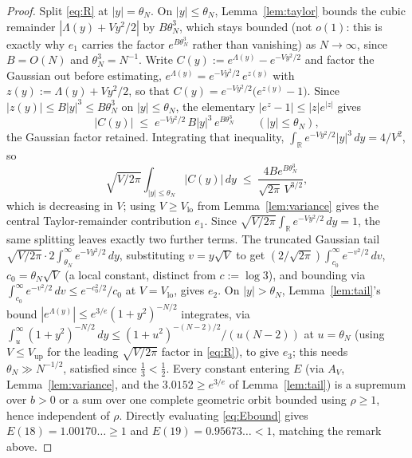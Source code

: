 \documentclass[11pt]{amsart}
\theoremstyle{plain}
\theoremstyle{definition}
\theoremstyle{remark}
\newcommand{\R}{\mathbb{R}}
\begin{document}
\begin{proof}
Split \eqref{eq:R} at $|y|=\theta_N$. On $|y|\le\theta_N$, Lemma~\ref{lem:taylor} bounds the cubic
remainder $|\Lambda(y)+Vy^2/2|$ by $B\theta_N^3$, which stays bounded (not $o(1)$: this is exactly
why $e_1$ carries the factor $e^{B\theta_N^3}$ rather than vanishing) as $N\to\infty$, since $B=O(N)$
and $\theta_N^3=N^{-1}$. Write $C(y):=e^{\Lambda(y)}-e^{-Vy^2/2}$ and factor the Gaussian out
before estimating, $e^{\Lambda(y)} = e^{-Vy^2/2}\,e^{z(y)}$ with $z(y) := \Lambda(y)+Vy^2/2$, so
that $C(y) = e^{-Vy^2/2}\bigl(e^{z(y)}-1\bigr)$. Since $|z(y)|\le B|y|^3 \le B\theta_N^3$ on
$|y|\le\theta_N$, the elementary $|e^z-1|\le|z|e^{|z|}$ gives
\[
|C(y)| \;\le\; e^{-Vy^2/2}\,B|y|^3\,e^{B\theta_N^3} \qquad (|y|\le\theta_N),
\]
the Gaussian factor retained. Integrating that inequality, $\int_\R e^{-Vy^2/2}|y|^3\,dy=4/V^2$, so
\[
\sqrt{V/2\pi}\int_{|y|\le\theta_N}|C(y)|\,dy \;\le\; \frac{4Be^{B\theta_N^3}}{\sqrt{2\pi}\,V^{3/2}},
\]
which is decreasing in $V$; using $V\ge V_{\mathrm{lo}}$ from Lemma~\ref{lem:variance} gives the
central Taylor-remainder contribution $e_1$. Since $\sqrt{V/2\pi}\int_\R e^{-Vy^2/2}\,dy = 1$, the
same splitting leaves exactly two further terms. The truncated Gaussian tail
$\sqrt{V/2\pi}\cdot2\int_{\theta_N}^\infty e^{-Vy^2/2}\,dy$, substituting $v=y\sqrt V$ to get
$(2/\sqrt{2\pi})\int_{c_0}^\infty e^{-v^2/2}\,dv$, $c_0=\theta_N\sqrt V$ (a local constant, distinct
from $c:=\log3$), and bounding via $\int_{c_0}^\infty e^{-v^2/2}\,dv\le e^{-c_0^2/2}/c_0$ at
$V=V_{\mathrm{lo}}$, gives $e_2$. On
$|y|>\theta_N$, Lemma~\ref{lem:tail}'s bound
$|e^{\Lambda(y)}|\le e^{3/e}(1+y^2)^{-N/2}$ integrates, via $\int_u^\infty(1+y^2)^{-N/2}\,dy \le
(1+u^2)^{-(N-2)/2}/(u(N-2))$ at $u=\theta_N$ (using $V\le V_{\mathrm{up}}$ for the leading
$\sqrt{V/2\pi}$ factor in \eqref{eq:R}), to give $e_3$; this needs $\theta_N \gg N^{-1/2}$, satisfied
since $\tfrac13<\tfrac12$. Every constant entering $E$ (via $A_V$, Lemma~\ref{lem:variance}, and the
$3.0152\ge e^{3/e}$ of Lemma~\ref{lem:tail}) is a supremum over $b>0$ or a sum over one complete
geometric orbit bounded using $\rho\ge1$, hence independent of $\rho$. Directly evaluating
\eqref{eq:Ebound} gives $E(18) = 1.00170\ldots \ge 1$ and $E(19) = 0.95673\ldots < 1$, matching the
remark above.


\end{proof}
\end{document}
